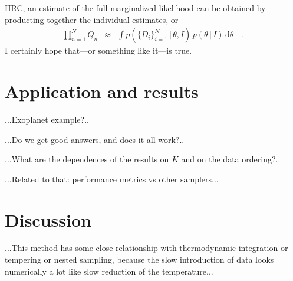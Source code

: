 \documentclass[12pt]{article}
\newcommand{\dd}{\mathrm{d}}
\newcommand{\given}{\,|\,}
\newcommand{\info}{I}
\newcommand{\pars}{\theta}
\newcommand{\dataset}[1]{\{D_i\}_{i=1}^{#1}}
\begin{document}
IIRC, an estimate of the full marginalized likelihood can be obtained
by producting together the individual estimates, or
\begin{eqnarray}\displaystyle
\prod_{n=1}^N Q_n &\approx& \int p(\dataset{N}\given\pars,\info)\,p(\pars\given\info)\,\dd\pars
\quad.
\end{eqnarray}
I certainly hope that---or something like it---is true.

\section{Application and results}

...Exoplanet example?..

...Do we get good answers, and does it all work?..

...What are the dependences of the results on $K$ and on the data ordering?..

...Related to that: performance metrics vs other samplers...

\section{Discussion}

...This method has some close relationship with thermodynamic
integration or tempering or nested sampling, because the slow
introduction of data looks numerically a lot like slow reduction of
the temperature...
\end{document}
